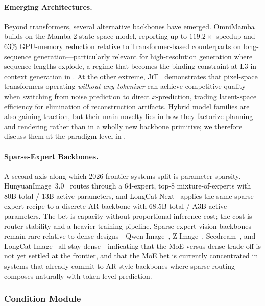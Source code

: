 \documentclass{llmxive}
\begin{document}
\paragraph{Emerging Architectures.}
Beyond transformers, several alternative backbones have emerged. OmniMamba~\citep{zou2025omnimamba} builds on the Mamba-2 state-space model, reporting up to $119.2\times$ speedup and $63\%$ GPU-memory reduction relative to Transformer-based counterparts on long-sequence generation---particularly relevant for high-resolution generation where sequence lengths explode, a regime that becomes the binding constraint at L3 in-context generation in . At the other extreme, JiT~\citep{li2025back} demonstrates that pixel-space transformers operating \emph{without any tokenizer} can achieve competitive quality when switching from noise prediction to direct $x$-prediction, trading latent-space efficiency for elimination of reconstruction artifacts. Hybrid model families are also gaining traction, but their main novelty lies in how they factorize planning and rendering rather than in a wholly new backbone primitive; we therefore discuss them at the paradigm level in .

\paragraph{Sparse-Expert Backbones.}
A second axis along which 2026 frontier systems split is parameter sparsity. HunyuanImage~3.0~\citep{cao2025hunyuanimage} routes through a 64-expert, top-8 mixture-of-experts with 80B total / 13B active parameters, and LongCat-Next~\citep{team2026longcat} applies the same sparse-expert recipe to a discrete-AR backbone with 68.5B total / A3B active parameters. The bet is capacity without proportional inference cost; the cost is router stability and a heavier training pipeline. Sparse-expert vision backbones remain rare relative to dense designs---Qwen-Image~\citep{wu2025qwen}, Z-Image~\citep{cai2025z}, Seedream~\citep{seedream2025seedream}, and LongCat-Image~\citep{team2025longcat} all stay dense---indicating that the MoE-versus-dense trade-off is not yet settled at the frontier, and that the MoE bet is currently concentrated in systems that already commit to AR-style backbones where sparse routing composes naturally with token-level prediction.


\subsubsection{Condition Module}
\label{sec:arch_condition}
\end{document}
